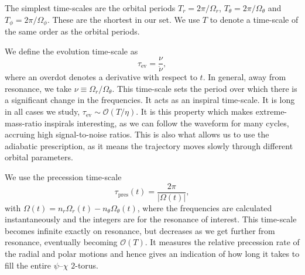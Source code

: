 \documentclass[aps,prd,amsfonts,amssymb,amsmath,nofootinbib,reprint,showpacs]{revtex4}
\newcommand{\sub}[1]{\ensuremath{_\text{#1}}}
\newcommand{\order}[1]{\ensuremath{\mathcal{O}({#1})}}
\begin{document}
The simplest time-scales are the orbital periods $T_r = 2\pi/\Omega_r$, $T_\theta = 2\pi/\Omega_\theta$ and $T_\phi = 2\pi/\Omega_\phi$. These are the shortest in our set. We use $T$ to denote a time-scale of the same order as the orbital periods.

We define the evolution time-scale as
\begin{equation}
\tau\sub{ev} = \frac{\nu}{\dot{\nu}},
\end{equation}
where an overdot denotes a derivative with respect to $t$. In general, away from resonance, we take $\nu \equiv \Omega_r/\Omega_\theta$. This time-scale sets the period over which there is a significant change in the frequencies. It acts as an inspiral time-scale. It is long in all cases we study, $\tau\sub{ev} \sim \order{T/\eta}$. It is this property which makes extreme-mass-ratio inspirals interesting, as we can follow the waveform for many cycles, accruing high signal-to-noise ratios. This is also what allows us to use the adiabatic prescription, as it means the trajectory moves slowly through different orbital parameters.

We use the precession time-scale
\begin{equation}
\tau\sub{pres}(t) = \frac{2\pi}{|\Omega(t)|},
\label{eq:t-pres}
\end{equation}
with $\Omega(t) = n_r \Omega_r(t) - n_\theta \Omega_\theta(t)$, where the frequencies are calculated instantaneously and the integers are for the resonance of interest. This time-scale becomes infinite exactly on resonance, but decreases as we get further from resonance, eventually becoming $\order{T}$. It measures the relative precession rate of the radial and polar motions and hence gives an indication of how long it takes to fill the entire $\psi$--$\chi$ $2$-torus.
\end{document}

